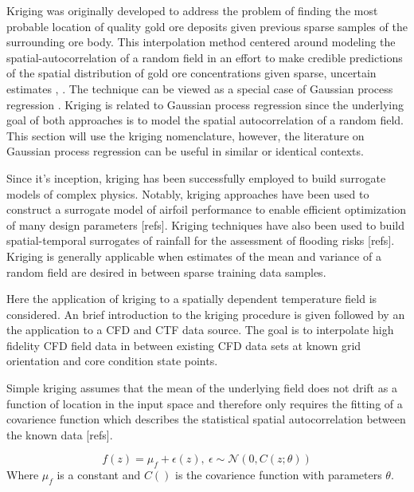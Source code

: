 Kriging was originally developed to address the problem of finding the most probable location of quality gold ore deposits given previous sparse samples of the surrounding ore body.  This interpolation method centered around modeling the spatial-autocorrelation of a random field in an effort to make credible predictions of the spatial distribution of gold ore concentrations given sparse, uncertain estimates \cite{krige51}, \cite{Krige51a}.   The technique can be viewed as a special case of Gaussian process regression \cite{Williams96}.  Kriging is related to Gaussian process regression since the underlying goal of both approaches is to model the spatial autocorrelation of a random field.  This section will use the kriging nomenclature, however, the literature on Gaussian process regression can be useful in similar or identical contexts.

Since it's inception, kriging has been successfully employed to build surrogate models of complex physics.  Notably, kriging approaches have been used to construct a surrogate model of airfoil performance to enable efficient optimization of many design parameters [refs].    Kriging techniques have also been used to build spatial-temporal surrogates of rainfall for the assessment of flooding risks [refs].  Kriging is generally applicable when estimates of the mean and variance of a random field are desired in between sparse training data samples.  

Here the application of kriging to a spatially dependent temperature field is considered.  An brief introduction to the kriging procedure is given followed by an the application to a CFD and CTF data source.  The goal is to interpolate high fidelity CFD field data in between existing CFD data sets at known grid orientation and core condition state points.

Simple kriging assumes that the mean of the underlying field does not drift as a function of location in the input space and therefore only requires the fitting of a covarience function which describes the statistical spatial autocorrelation between the known data [refs].  

\begin{equation}
f(z) = \mu_f + \epsilon(z),\ \epsilon \sim \mathcal N(0, C(z;\theta))
\end{equation}
Where $\mu_f$ is a constant and $C()$ is the covarience function with parameters $\theta$.

